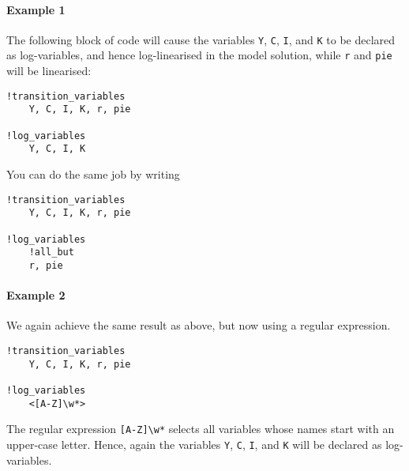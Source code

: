 \paragraph{Example 1}\label{example-1}

The following block of code will cause the variables \texttt{Y},
\texttt{C}, \texttt{I}, and \texttt{K} to be declared as log-variables,
and hence log-linearised in the model solution, while \texttt{r} and
\texttt{pie} will be linearised:

\begin{verbatim}
!transition_variables
    Y, C, I, K, r, pie

!log_variables
    Y, C, I, K
\end{verbatim}

You can do the same job by writing

\begin{verbatim}
!transition_variables
    Y, C, I, K, r, pie

!log_variables
    !all_but
    r, pie
\end{verbatim}

\paragraph{Example 2}\label{example-2}

We again achieve the same result as above, but now using a regular
expression.

\begin{verbatim}
!transition_variables
    Y, C, I, K, r, pie

!log_variables
    <[A-Z]\w*>
\end{verbatim}

The regular expression \texttt{{[}A-Z{]}\textbackslash{}w*} selects all
variables whose names start with an upper-case letter. Hence, again the
variables \texttt{Y}, \texttt{C}, \texttt{I}, and \texttt{K} will be
declared as log-variables.


